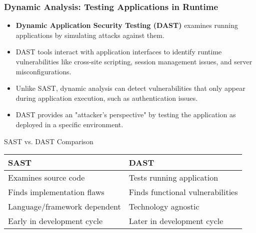 \documentclass{beamer}
\begin{document}
\begin{frame}
\frametitle{Dynamic Analysis: Testing Applications in Runtime}
\begin{itemize}
\item \textbf{Dynamic Application Security Testing (DAST)} examines running applications by simulating attacks against them.
\item DAST tools interact with application interfaces to identify runtime vulnerabilities like cross-site scripting, session management issues, and server misconfigurations.
\item Unlike SAST, dynamic analysis can detect vulnerabilities that only appear during application execution, such as authentication issues.
\item DAST provides an "attacker's perspective" by testing the application as deployed in a specific environment.
\end{itemize}

\begin{block}{SAST vs. DAST Comparison}
\scriptsize
\centering
\begin{tabular}{|p{4cm}|p{4cm}|}
\hline
\textbf{SAST} & \textbf{DAST} \\
\hline
Examines source code & Tests running application \\
\hline
Finds implementation flaws & Finds functional vulnerabilities \\
\hline
Language/framework dependent & Technology agnostic \\
\hline
Early in development cycle & Later in development cycle \\
\hline
\end{tabular}
\end{block}
\end{frame}
\end{document}
